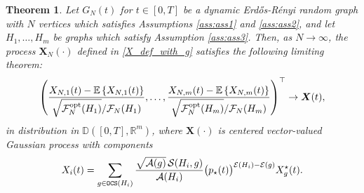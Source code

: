 \documentclass[11pt,reqno]{amsart}
\numberwithin{equation}{section}
\newcommand{\E}[1]{\mathbb{E}\left\{ #1\right\}}
\newcommand{\R}{\mathbb{R}}
\newtheorem{theo}{Theorem}[section]
\newcommand{\kb}[1]{\boldsymbol{#1}}
\newcommand{\vk}[1]{\kb{#1}}
\begin{document}
\begin{theo}\label{main}
    {Let $G_N(t)$ for $t\in[0,T]$ be a dynamic Erd\H{o}s-R\'{e}nyi random graph with $N$ vertices which satisfies Assumptions \ref{ass:ass1} and \ref{ass:ass2}, and let $H_1,\ldots, H_{m}$ be {graphs} which satisfy Assumption \ref{ass:ass3}. Then, as $N\to\infty$, the process $\vk X_N(\cdot)$ defined in \eqref{X_def_with_g} satisfies the following limiting theorem:}
    \begin{align*}
        \left(\frac{X_{N,1}(t) - \E{X_{N,1}(t)}}{\sqrt{\mathcal{F}^{\rm opt}_N({H}_1)}/\mathcal{F}_N({H}_1)},\ldots,\frac{X_{N,m}(t) - \E{X_{N,m}(t)}}{\sqrt{\mathcal{F}^{\rm opt}_N({H}_m)}/\mathcal{F}_N({H}_m)}\right)^{\top}\to \vk X(t),
    \end{align*}
    in distribution in $\mathbb{D}([0,T],\R^{m})$, where {$\vk X(\cdot)$} is centered vector-valued Gaussian process with components
    \begin{align*}
        X_i(t) = \sum_{g\in{\tt OCS}({H}_i)}\frac{\sqrt{\mathcal{A}(g)}\,\mathcal{S}({H}_i,g)}{\mathcal{A}({H}_i)}\bigl(p_{\star}(t)\bigr)^{\mathcal{E}({H}_i) - \mathcal{E}(g)}X^{\star}_{g}(t).
    \end{align*}
\end{theo}
\end{document}
